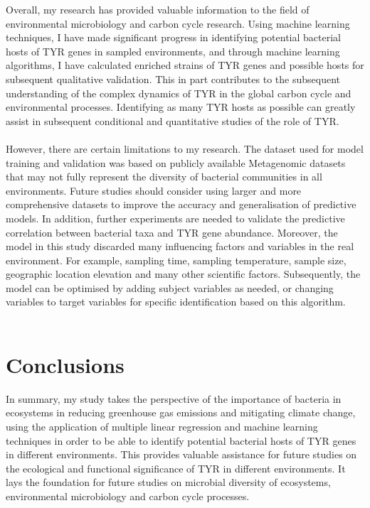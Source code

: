 \documentclass[12pt]{article}
\begin{document}
Overall, my research has provided valuable information to the field of environmental microbiology and carbon cycle research. Using machine learning techniques, I have made significant progress in identifying potential bacterial hosts of TYR genes in sampled environments, and through machine learning algorithms, I have calculated enriched strains of TYR genes and possible hosts for subsequent qualitative validation. This in part contributes to the subsequent understanding of the complex dynamics of TYR in the global carbon cycle and environmental processes. Identifying as many TYR hosts as possible can greatly assist in subsequent conditional and quantitative studies of the role of TYR.\\\\
However, there are certain limitations to my research. The dataset used for model training and validation was based on publicly available Metagenomic datasets that may not fully represent the diversity of bacterial communities in all environments. Future studies should consider using larger and more comprehensive datasets to improve the accuracy and generalisation of predictive models. In addition, further experiments are needed to validate the predictive correlation between bacterial taxa and TYR gene abundance. Moreover, the model in this study discarded many influencing factors and variables in the real environment. For example, sampling time, sampling temperature, sample size, geographic location elevation and many other scientific factors. Subsequently, the model can be optimised by adding subject variables as needed, or changing variables to target variables for specific identification based on this algorithm.\\\\

\section{Conclusions}
In summary, my study takes the perspective of the importance of bacteria in ecosystems in reducing greenhouse gas emissions and mitigating climate change, using the application of multiple linear regression and machine learning techniques in order to be able to identify potential bacterial hosts of TYR genes in different environments. This provides valuable assistance for future studies on the ecological and functional significance of TYR in different environments. It lays the foundation for future studies on microbial diversity of ecosystems, environmental microbiology and carbon cycle processes.
 
\newpage    

    
\end{document}
